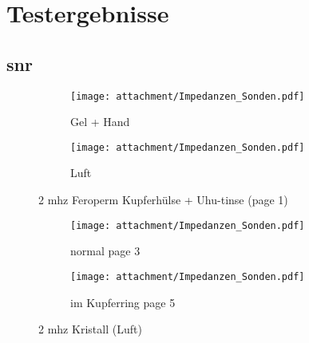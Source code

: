 \appendix
\chapter{Testergebnisse}
\section{\ac{snr}}
%
\begin{figure}[ht!]
	\centering
	\begin{subfigure}[t!]{0.82\textwidth}
		\centering
  		\texttt{[image: attachment/Impedanzen\_Sonden.pdf]}%
 		\caption{Gel + Hand}
 		\label{fig:2_sig}
  	\end{subfigure}
  	\begin{subfigure}[t!]{0.82\textwidth}
	  	\centering
  		\texttt{[image: attachment/Impedanzen\_Sonden.pdf]} %
  		\caption{Luft}
 		\label{fig:snr_2_script}
  	\end{subfigure}
  	\caption{2 \ac{mhz} Feroperm Kupferhülse + Uhu-tinse (page 1)}
\end{figure}
\clearpage

\begin{figure}[ht!]
	\centering
	\begin{subfigure}[t!]{0.82\textwidth}
	  	\centering
  		\texttt{[image: attachment/Impedanzen\_Sonden.pdf]} %
  		\caption{normal page 3}
 		\label{fig:snr_2_script}
  	\end{subfigure}
  	\begin{subfigure}[t!]{0.82\textwidth}
	  	\centering
  		\texttt{[image: attachment/Impedanzen\_Sonden.pdf]} %
  		\caption{im Kupferring page 5}
 		\label{fig:snr_2_script}
  	\end{subfigure}
  	\caption{2 \ac{mhz} Kristall (Luft) }
\end{figure}
\clearpage

